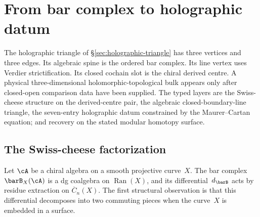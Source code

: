 
\providecommand{\PhiFA}{\Phi^{\mathrm{FA}}}
\providecommand{\SpCh}{\mathrm{Sp}^{\mathrm{ch}}}


\section{From bar complex to holographic datum}
\label{sec:thqg-intro-bar-to-holographic}

The holographic triangle of \S\ref{sec:holographic-triangle} has three
vertices and three edges. Its algebraic spine is the ordered bar
complex. Its line vertex uses Verdier strictification. Its closed
cochain slot is the chiral derived centre. A physical
three-dimensional holomorphic-topological bulk appears only after
closed-open comparison data have been supplied. The typed layers are
the Swiss-cheese structure on the derived-centre pair, the algebraic
closed-boundary-line triangle, the seven-entry holographic datum
constrained by the Maurer--Cartan equation; and recovery on the stated
modular homotopy surface.

\subsection{The Swiss-cheese factorization}
\label{subsec:thqg-intro-swiss-cheese}

Let $\cA$ be a chiral algebra on a smooth projective curve~$X$. The
bar complex $\barB_X(\cA)$ is a dg coalgebra on $\operatorname{Ran}(X)$,
and its differential~$d_{\barB}$ acts by residue extraction on
$\overline{C}_n(X)$. The first structural observation is that this
differential decomposes into two commuting pieces when the curve~$X$
is embedded in a surface.

